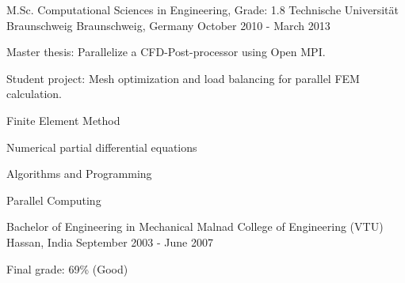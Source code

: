 \begin{cventries}
  \cventry
    {M.Sc. Computational Sciences in Engineering, Grade: 1.8}
    {Technische Universität Braunschweig}
    {Braunschweig, Germany}
    {October 2010 - March 2013}
    {
      \begin{cvitems}
        \item {Master thesis: Parallelize a CFD-Post-processor using Open MPI.}
        \item {Student project: Mesh optimization and load balancing for parallel FEM calculation.}
        \item {Finite Element Method}
        \item {Numerical partial differential equations}
        \item {Algorithms and Programming}
        \item {Parallel Computing}
      \end{cvitems}
    }

    \cventry
    {Bachelor of Engineering in Mechanical}
    {Malnad College of Engineering (VTU)}
    {Hassan, India}
    {September 2003 - June 2007}
    {
      \begin{cvitems}
        \item {Final grade: 69\% (Good)}
      \end{cvitems}
    }
    
\end{cventries}

